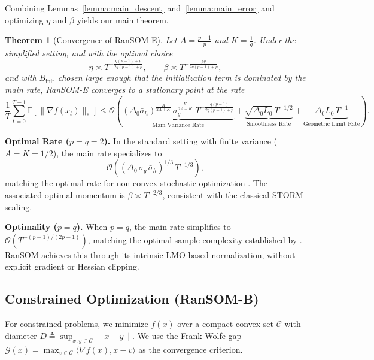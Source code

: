 \documentclass{article}
\theoremstyle{plain}
\newtheorem{theorem}{Theorem}[section]
\theoremstyle{definition}
\theoremstyle{remark}
\begin{document}
\noindent Combining Lemmas~\ref{lemma:main_descent}
and~\ref{lemma:main_error} and optimizing $\eta$ and $\beta$ yields our
main theorem.
 
\begin{theorem}[Convergence of RanSOM-E]
\label{thm:expsom_convergence}
Let $A = \frac{p-1}{p}$ and $K = \frac{1}{q}$. Under the simplified
setting, and with the optimal choice
\begin{equation}
    \eta \asymp T^{-\frac{q(p-1)+p}{2q(p-1)+p}},
    \qquad
    \beta \asymp T^{-\frac{pq}{2q(p-1)+p}},
\end{equation}
and with $B_{\mathrm{init}}$ chosen large enough that the
initialization term is dominated by the main rate, RanSOM-E converges
to a stationary point at the rate
\begin{equation}
\label{eq:expsom_rate}
    \frac{1}{T}\sum_{t=0}^{T-1}\mathbb{E}[\|\nabla f(x_t)\|_*]
    \le 
    \mathcal{O}\!\left(\underbrace{
        (\Delta_0\bar\sigma_h)^{\tfrac{A}{2A+K}}\,
        \sigma_g^{\tfrac{K}{2A+K}}\;
        T^{-\tfrac{q(p-1)}{2q(p-1)+p}}
    }_{\text{Main Variance Rate}}
    + \underbrace{\sqrt{\Delta_0 L_0}\, T^{-1/2}}_{\text{Smoothness Rate}}
    + \underbrace{\Delta_0 L_0\, T^{-1}}_{\text{Geometric Limit Rate}}\right).
\end{equation}
\end{theorem}
 
\textbf{Optimal Rate ($p = q = 2$).}
In the standard setting with finite variance ($A = K = 1/2$), the main
rate specializes to
\[
    \mathcal{O}\!\left((\Delta_0\,\sigma_g\,\bar\sigma_h)^{1/3}\,T^{-1/3}\right),
\]
matching the optimal rate for non-convex stochastic optimization
\cite{cutkosky2019storm, arjevani2023lower}. The associated optimal
momentum is $\beta \asymp T^{-2/3}$, consistent with the classical
STORM scaling.
 
\textbf{Optimality ($p = q$).}
When $p = q$, the main rate simplifies to $\mathcal{O}(T^{-(p-1)/(2p-1)})$,
matching the optimal sample complexity established by
\citet{sadiev2025second}. RanSOM achieves this through its intrinsic
LMO-based normalization, without explicit gradient or Hessian clipping.
 


\subsection{Constrained Optimization (RanSOM-B)}

For constrained problems, we minimize $f(x)$ over a compact convex set $\mathcal{C}$ with diameter $D \triangleq \sup_{x,y \in \mathcal{C}} \|x-y\|$. We use the Frank-Wolfe gap $\mathcal{G}(x) = \max_{v \in \mathcal{C}} \langle \nabla f(x), x-v \rangle$ as the convergence criterion.
\end{document}

